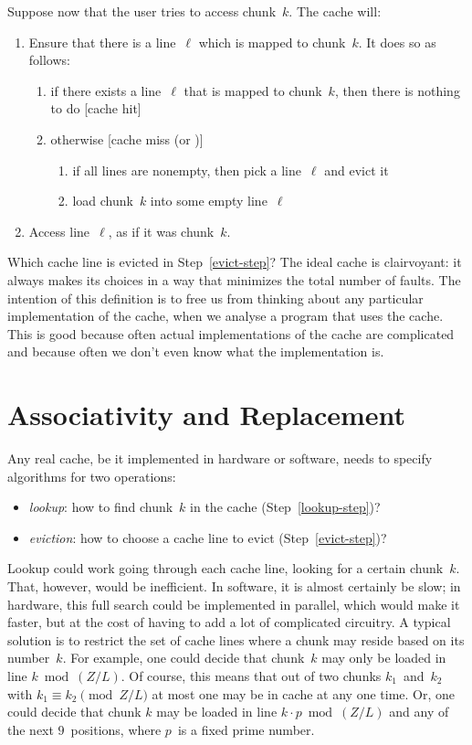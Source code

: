 Suppose now that the user tries to access chunk~$k$.
The cache will:
\begin{enumerate}
\item
  Ensure that there is a line~$\ell$ which is mapped to chunk~$k$.
  It does so as follows:
  \begin{enumerate}
  \item \label{lookup-step}
    if there exists a line~$\ell$ that is mapped to chunk~$k$,
    then there is nothing to do [cache hit]
  \item otherwise [cache miss (or )]
    \begin{enumerate}
    \item \label{evict-step}
      if all lines are nonempty, then pick a line~$\ell$ and evict it
    \item
      load chunk~$k$ into some empty line~$\ell$
    \end{enumerate}
  \end{enumerate}
\item Access line~$\ell$, as if it was chunk~$k$.
\end{enumerate}
Which cache line is evicted in Step~\ref{evict-step}?
The ideal cache is clairvoyant:
  it always makes its choices in a way that minimizes the total number of faults.
The intention of this definition is to free us
  from thinking about any particular implementation of the cache,
  when we analyse a program that uses the cache.
This is good because often actual implementations of the cache are complicated
  and because often we don't even know what the implementation is.

\section*{Associativity and Replacement}

Any real cache, be it implemented in hardware or software,
  needs to specify algorithms for two operations:
\begin{itemize}
\item \emph{lookup}:
  how to find chunk~$k$ in the cache (Step~\ref{lookup-step})?
\item \emph{eviction}:
  how to choose a cache line to evict (Step~\ref{evict-step})?
\end{itemize}

\smallskip

Lookup could work going through each cache line, looking for a certain chunk~$k$.
That, however, would be inefficient.
In software, it is almost certainly be slow;
  in hardware, this full search could be implemented in parallel,
    which would make it faster,
    but at the cost of having to add a lot of complicated circuitry.
A typical solution is to restrict the set of cache lines where a chunk may reside
  based on its number~$k$.
For example,
  one could decide that chunk~$k$ may only be loaded in line $k \bmod (Z/L)$.
Of course,
  this means that out of two chunks $k_1$~and~$k_2$
    with $k_1 \equiv k_2 \pmod{Z/L}$
  at most one may be in cache at any one time.
Or, one could decide that chunk $k$ may be loaded in line $k\cdot p \bmod (Z/L)$
  and any of the next $9$~positions,
  where $p$~is a fixed prime number.

